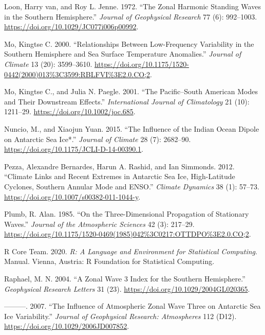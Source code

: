 \documentclass[smallextended]{svjour3}       %
\newlength{\cslhangindent}
\newlength{\cslentryspacingunit} %
\newenvironment{CSLReferences}[2] %
 {%
  \setlength{\parindent}{0pt}
  \ifodd #1
  \let\oldpar\par
  \def\par{\hangindent=\cslhangindent\oldpar}
  \fi
  \setlength{\parskip}{#2\cslentryspacingunit}
 }%
 {}
\begin{document}
\begin{CSLReferences}{1}{0}
\leavevmode{}%
Loon, Harry van, and Roy L. Jenne. 1972. {``The Zonal Harmonic Standing Waves in the Southern Hemisphere.''} \emph{Journal of Geophysical Research} 77 (6): 992--1003. \url{https://doi.org/10.1029/JC077i006p00992}.

\leavevmode{}%
Mo, Kingtse C. 2000. {``Relationships Between {Low-Frequency Variability} in the {Southern Hemisphere} and {Sea Surface Temperature Anomalies}.''} \emph{Journal of Climate} 13 (20): 3599--3610. \url{https://doi.org/10.1175/1520-0442(2000)013\%3C3599:RBLFVI\%3E2.0.CO;2}.

\leavevmode{}%
Mo, Kingtse C., and Julia N. Paegle. 2001. {``The {Pacific}--{South American} Modes and Their Downstream Effects.''} \emph{International Journal of Climatology} 21 (10): 1211--29. \url{https://doi.org/10.1002/joc.685}.

\leavevmode{}%
Nuncio, M., and Xiaojun Yuan. 2015. {``The {Influence} of the {Indian Ocean Dipole} on {Antarctic Sea Ice}*.''} \emph{Journal of Climate} 28 (7): 2682--90. \url{https://doi.org/10.1175/JCLI-D-14-00390.1}.

\leavevmode{}%
Pezza, Alexandre Bernardes, Harun A. Rashid, and Ian Simmonds. 2012. {``Climate Links and Recent Extremes in Antarctic Sea Ice, High-Latitude Cyclones, {Southern Annular Mode} and {ENSO}.''} \emph{Climate Dynamics} 38 (1): 57--73. \url{https://doi.org/10.1007/s00382-011-1044-y}.

\leavevmode{}%
Plumb, R. Alan. 1985. {``On the {Three-Dimensional Propagation} of {Stationary Waves}.''} \emph{Journal of the Atmospheric Sciences} 42 (3): 217--29. \url{https://doi.org/10.1175/1520-0469(1985)042\%3C0217:OTTDPO\%3E2.0.CO;2}.

\leavevmode{}%
R Core Team. 2020. \emph{R: {A} Language and Environment for Statistical Computing}. Manual. {Vienna, Austria}: {R Foundation for Statistical Computing}.

\leavevmode{}%
Raphael, M. N. 2004. {``A Zonal Wave 3 Index for the {Southern Hemisphere}.''} \emph{Geophysical Research Letters} 31 (23). \url{https://doi.org/10.1029/2004GL020365}.

\leavevmode{}%
---------. 2007. {``The Influence of Atmospheric Zonal Wave Three on {Antarctic} Sea Ice Variability.''} \emph{Journal of Geophysical Research: Atmospheres} 112 (D12). \url{https://doi.org/10.1029/2006JD007852}.


\end{CSLReferences}
\end{document}
